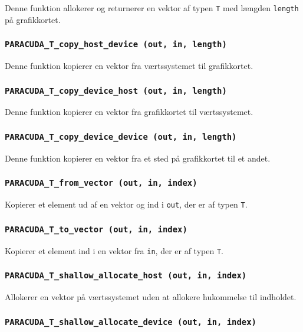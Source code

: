 Denne funktion allokerer og returnerer en vektor af typen \verb|T| med længden \verb|length| på grafikkortet.

\subsubsection*{\texttt{PARACUDA\_T\_copy\_host\_device \scriptsize(out, in, length)}}

Denne funktion kopierer en vektor fra værtssystemet til grafikkortet.

\subsubsection*{\texttt{PARACUDA\_T\_copy\_device\_host \scriptsize(out, in, length)}}

Denne funktion kopierer en vektor fra grafikkortet til værtssystemet.

\subsubsection*{\texttt{PARACUDA\_T\_copy\_device\_device \scriptsize(out, in, length)}}

Denne funktion kopierer en vektor fra et sted på grafikkortet til et andet.

\subsubsection*{\texttt{PARACUDA\_T\_from\_vector \scriptsize(out, in, index)}}

Kopierer et element ud af en vektor og ind i \verb|out|, der er af typen \verb|T|.

\subsubsection*{\texttt{PARACUDA\_T\_to\_vector \scriptsize(out, in, index)}}

Kopierer et element ind i en vektor fra \verb|in|, der er af typen \verb|T|.

\subsubsection*{\texttt{PARACUDA\_T\_shallow\_allocate\_host \scriptsize(out, in, index)}}

Allokerer en vektor på værtssystemet uden at allokere hukommelse til indholdet.

\subsubsection*{\texttt{PARACUDA\_T\_shallow\_allocate\_device \scriptsize(out, in, index)}}

